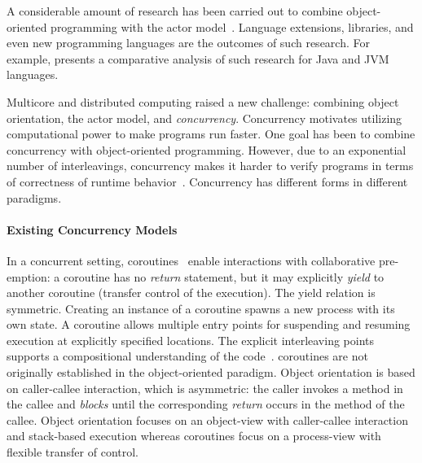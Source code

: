 A considerable amount of research has been carried out to combine object-oriented programming with the actor model~\cite{philippsen2000survey}. 
Language extensions, libraries, and even new programming languages are the  outcomes of such research.
For example, \cite{actor_frameworks_jvm:agha} presents a comparative analysis of such research for Java and JVM languages.

Multicore and distributed computing raised a new challenge: combining object orientation, the actor model, and \emph{concurrency}.
Concurrency motivates utilizing computational power to make programs run faster.
One goal has been to combine concurrency with object-oriented programming.
However, due to an exponential number of interleavings, concurrency makes it harder to verify programs in terms of correctness of runtime behavior~\cite{Herlihy:1990:linear,johnsen:history,agha:predictive:safety}. 
Concurrency has different forms in different paradigms.

\paragraph*{Existing Concurrency Models}
In a concurrent setting, coroutines~\cite{conway1963design,taocp:knuth} enable interactions with collaborative pre-emption:
a coroutine has no \emph{return} statement, but it may explicitly \emph{yield}
to another coroutine (transfer control of the execution).
The yield relation is symmetric. 
Creating an instance of a coroutine spawns a new process with its own state.
A coroutine allows multiple entry points for suspending and resuming execution at explicitly specified locations.
The explicit interleaving points supports a compositional understanding of the code~\cite{DBLP:journals/cacm/Hoare74}.
coroutines are not originally established in the object-oriented paradigm.
Object orientation is based on caller-callee interaction, which is asymmetric:
the caller invokes a method in the callee and \emph{blocks} until the
corresponding \emph{return} occurs in the method of the callee.
Object orientation focuses on an object-view with caller-callee interaction and stack-based execution whereas coroutines focus on a process-view with flexible transfer of control.

